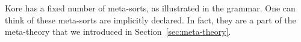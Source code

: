 \documentclass[UTF8,11pt]{article}
\theoremstyle{plain}
\theoremstyle{definition}
\theoremstyle{remark}
\newcommand{\parametric}[2]{{#1}\raisebox{.2ex}{\texttt{\footnotesize{\{}}}#2\raisebox{.2ex}{\texttt{\footnotesize{\}}}}}
\newcommand{\sharpsymbol}{\#}
\newcommand{\KSort}{\texttt{\sharpsymbol Sort}}
\newcommand{\KPatternList}{\texttt{\sharpsymbol PatternList}}
\newcommand{\KPattern}{\texttt{\sharpsymbol Pattern}}
\newcommand{\itsort}{\mathit{sort}}
\begin{document}
Kore has a fixed number of meta-sorts, as illustrated in the grammar.
One can think of these meta-sorts are implicitly declared.
In fact, they are a part of the meta-theory that we introduced in 
Section~\ref{sec:meta-theory}.





\end{document}

